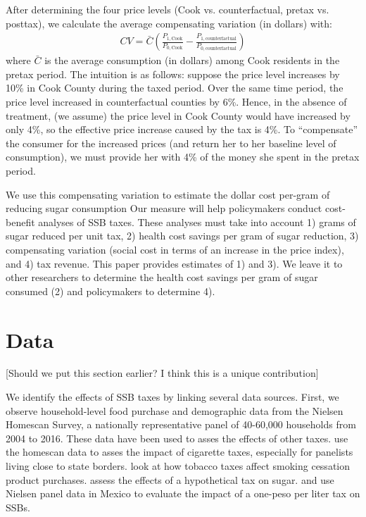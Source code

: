 \documentclass[12pt]{article}
\begin{document}
 After determining the four price levels (Cook vs. counterfactual, pretax vs. posttax), we  calculate the average compensating variation (in dollars) with:
\begin{align}
CV = \bar{C}\left(\frac{P_{1,\text{Cook}}}{P_{0,\text{Cook}}} - \frac{P_{1,\text{counterfactual}}}{P_{0,\text{counterfactual}}}\right) \label{cv}
\end{align}
where $\bar{C}$ is the average consumption (in dollars) among Cook residents in the pretax period. The intuition is as follows: suppose the price level increases by 10\% in Cook County during the taxed period. Over the same time period, the price level increased in counterfactual counties by 6\%. Hence, in the absence of treatment, (we assume) the price level in Cook County would have increased by only 4\%, so the effective price increase caused by the tax is 4\%. To ``compensate'' the consumer for the increased prices (and return her to her baseline level of consumption), we must provide her with 4\% of the money she spent in the pretax period.

We  use this compensating variation to estimate the dollar cost per-gram of reducing sugar consumption    Our measure will help policymakers conduct cost-benefit analyses of SSB taxes. These analyses must take into account 1) grams of sugar reduced per unit tax, 2) health cost savings per gram of sugar reduction, 3) compensating variation (social cost in terms of an increase in the price index), and 4) tax revenue. This paper provides estimates of 1) and 3). We leave it to other researchers to determine the health cost savings per gram of sugar consumed (2) and policymakers to determine 4).
\section{Data} \label{data}

[Should we put this section earlier? I think this is a unique contribution]

We identify the effects of SSB taxes by linking several data sources. First, we observe household-level food purchase and demographic data from the Nielsen Homescan Survey, a nationally representative panel of 40-60,000 households from 2004 to 2016. These data have been used to asses the effects of other taxes. \textcite{harding2012heterogeneous} use the homescan data to asses the impact of cigarette taxes, especially for panelists living close to state borders. \textcite{cotti2016effects} look at how tobacco taxes affect smoking cessation product purchases. \textcite{dharmasena2012intended} assess the effects of a hypothetical tax on sugar. \textcite{colchero2016beverage} and \textcite{colchero2017mexico} use Nielsen panel data in Mexico to evaluate the impact of a one-peso per liter tax on SSBs.
\end{document}
